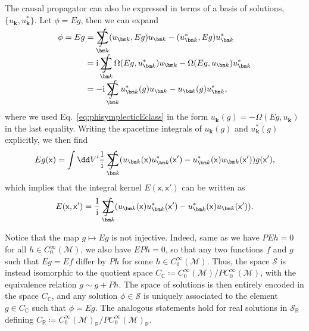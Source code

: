 \documentclass[letterpaper,12pt,titlepage,oneside,final]{book}
\newcommand{\M}{\mathcal{M}}
\renewcommand{\S}{\mathcal{S}}
\newcommand{\mf}{\mathsf}%
\newcommand{\ii}{\mathrm{i}}
\DeclareMathOperator*{\sumint}{%
\mathchoice%
  {\ooalign{$\displaystyle\sum$\cr\hidewidth$\displaystyle\int$\hidewidth\cr}}
  {\ooalign{\raisebox{.14\height}{\scalebox{.7}{$\textstyle\sum$}}\cr\hidewidth$\textstyle\int$\hidewidth\cr}}
  {\ooalign{\raisebox{.2\height}{\scalebox{.6}{$\scriptstyle\sum$}}\cr$\scriptstyle\int$\cr}}
  {\ooalign{\raisebox{.2\height}{\scalebox{.6}{$\scriptstyle\sum$}}\cr$\scriptstyle\int$\cr}}
}
\begin{document}
The causal propagator can also be expressed in terms of a basis of solutions, $\{u_{\bm k}, u_{\bm k}^*\}$. Let $\phi = Eg$, then we can expand
\begin{align}
    \phi = Eg &= \sumint_{\bm k} (u_{\bm k},Eg)u_{\bm k} - (u_{\bm k}^*,Eg) u_{\bm k}^*\\
    &= \ii \sumint_{\bm k} \Omega(Eg,u_{\bm k}^*)u_{\bm k} - \Omega(Eg,u_{\bm k}) u_{\bm k}^*\\
    &= -\ii \sumint_{\bm k} u_{\bm k}^*(g)u_{\bm k} - u_{\bm k}(g)u_{\bm k}^*,
\end{align}
where we used Eq.~\eqref{eq:phisymplecticEclass} in the form $u_{\bm k}(g) = -\Omega(Eg,u_{\bm k})$ in the last equality. Writing the spacetime integrals of $u_{\bm k}(g)$ and $u_{\bm k}^*(g)$ explicitly, we then find
\begin{equation}
    Eg(\mf x) = \int \dd V' \frac{1}{\ii}\sumint_{\bm k} (u_{\bm k}(\mf x)u_{\bm k}^*(\mf x') - u_{\bm k}^*(\mf x)u_{\bm k}(\mf x')) g(\mf x'),    
\end{equation}
which implies that the integral kernel $E(\mf x, \mf x')$ can be written as
\begin{equation}\label{eq:Euki}
    E(\mf x, \mf x') = \frac{1}{\ii}\sumint_{\bm k} (u_{\bm k}(\mf x)u_{\bm k}^*(\mf x') - u_{\bm k}^*(\mf x)u_{\bm k}(\mf x')).
\end{equation}



Notice that the map $g\mapsto Eg$ is not injective. Indeed,  same as we have $PEh = 0$ for all $h\in C_0^\infty(\M)$, we also have $EPh = 0$, so that any two functions $f$ and $g$ such that $Eg = Ef$ differ by $Ph$ for some $h\in C_0^\infty(\M)$. Thus, the space $\S$ is instead isomorphic to the quotient space $C_\mathbb{C} \coloneqq C_0^\infty(\M)/PC_0^\infty(\M)$, with the equivalence relation $g\sim g+Ph$. The space of solutions is then entirely encoded in the space $C_\mathbb{C}$, and any solution $\phi\in \S$ is uniquely associated to the element $g\in C_\mathbb{C}$ such that $\phi = Eg$. The analogous statements hold for real solutions in $\S_\mathbb{R}$ defining $C_\mathbb{R} \coloneqq C_0^\infty(\M)_\mathbb{R}/PC_0^\infty(\M)_\mathbb{R}$. 

\end{document}
